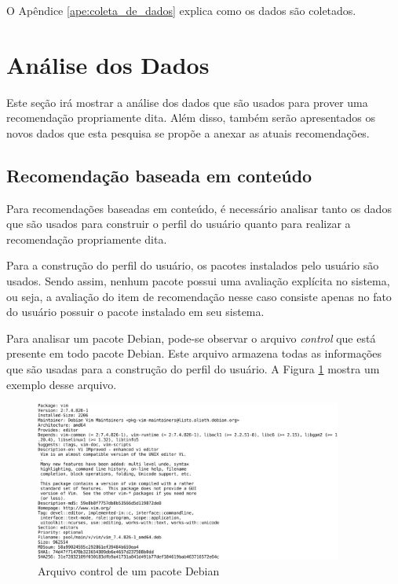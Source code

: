 O Apêndice \ref{ape:coleta_de_dados} explica como os dados são coletados.

\section{Análise dos Dados}

Este seção irá mostrar a análise dos dados que são usados para prover uma
recomendação propriamente dita. Além disso, também serão apresentados os novos dados
que esta pesquisa se propõe a anexar as atuais recomendações.

\subsection{Recomendação baseada em conteúdo}

Para recomendações baseadas em conteúdo, é necessário analisar tanto os dados
que são usados para construir o perfil do usuário quanto para realizar a
recomendação propriamente dita.

Para a construção do perfil do usuário, os pacotes instalados pelo usuário são
usados. Sendo assim, nenhum pacote possui uma avaliação explícita no sistema,
ou seja, a avaliação do item de recomendação nesse caso consiste apenas no fato
do usuário possuir o pacote instalado em seu sistema.

Para analisar um pacote Debian, pode-se observar o arquivo \textit{control} que
está presente em todo pacote Debian. Este arquivo
armazena todas as informações que são usadas para a construção do perfil do
usuário. A Figura \ref{fig:control_pacote} mostra um exemplo desse arquivo.

\begin{figure}[h]
  \centering
  \includegraphics[width=0.9\textwidth]{figuras/control_pacote.eps}
  \caption{Arquivo control de um pacote Debian}
  \label{fig:control_pacote}
\end{figure}

